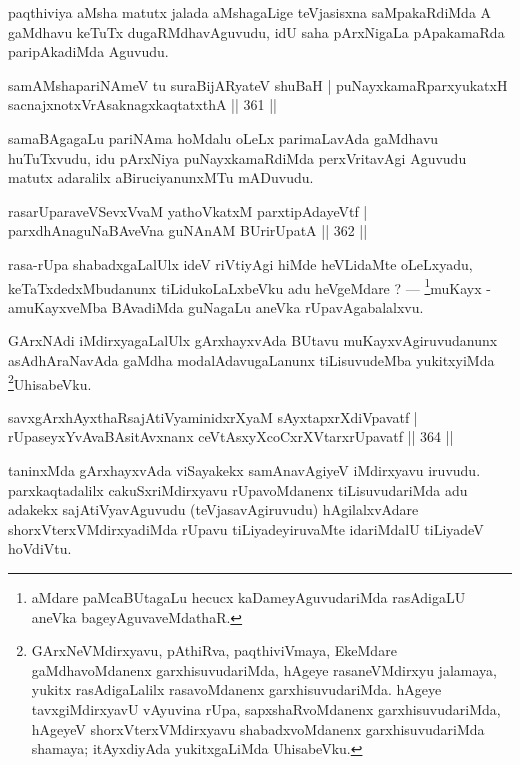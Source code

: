 \begin{artha}
paqthiviya aMsha matutx jalada aMshagaLige teVjasisxna saMpakaRdiMda A gaMdhavu keTuTx dugaRMdhavAguvudu, idU saha pArxNigaLa pApakamaRda paripAkadiMda Aguvudu.
\end{artha}

\begin{shl}
samAMshapariNAmeV tu suraBijARyateV shuBaH |
puNayxkamaRparxyukatxH sacnajxnotxVrAsaknagxkaqtatxthA \hfill || 361 ||
\end{shl}

\begin{artha}
samaBAgagaLu pariNAma hoMdalu oLeLx parimaLavAda gaMdhavu huTuTxvudu, idu pArxNiya puNayxkamaRdiMda perxVritavAgi Aguvudu matutx adaralilx aBiruciyanunxMTu mADuvudu.
\end{artha}

\begin{shl}
rasarUparaveVSevxVvaM yathoVkatxM parxtipAdayeVtf |
parxdhAnaguNaBAveVna guNAnAM BUrirUpatA \hfill  || 362 ||
\end{shl}

\begin{artha}
rasa-rUpa shabadxgaLalUlx ideV riVtiyAgi hiMde heVLidaMte oLeLxyadu, keTaTxdedxMbudanunx tiLidukoLaLxbeVku adu heVgeMdare ?  {\rm ---}  \footnote[1]{aMdare paMcaBUtagaLu hecucx kaDameyAguvudariMda rasAdigaLU aneVka bageyAguva\-veMdathaR.}muKayx - amuKayxveMba BAvadiMda guNagaLu aneVka rUpavAgabalalxvu.
\end{artha}

\begin{artha}
GArxNAdi iMdirxyagaLalUlx gArxhayxvAda BUtavu muKayxvAgiruvudanunx asAdhAraNavAda gaMdha modalAdavugaLanunx tiLisuvudeMba yukitxyiMda \footnote[2]{GArxNeVMdirxyavu, pAthiRva, paqthiviVmaya, EkeMdare gaMdhavoMdanenx garxhisuvudariMda, hAgeye rasaneVMdirxyu jalamaya, yukitx rasAdigaLalilx rasavoMdanenx garxhisuvudariMda. hAgeye tavxgiMdirxyavU vAyuvina rUpa, sapxshaRvoMdanenx garxhisuvudariMda, hAgeyeV shorxVterxVMdirxyavu shabadxvoMdanenx garxhisuvudariMda shamaya; itAyxdiyAda yukitxgaLiMda UhisabeVku.}UhisabeVku.
\end{artha}

\begin{shl}
savxgArxhAyxthaRsajAtiVyaminidxrXyaM sAyxtapxrXdiVpavatf |
rUpaseyxYvAvaBAsitAvxnanx ceVtAsxyXcoCxrXVtarxrUpavatf \hfill || 364 ||
\end{shl}

\begin{artha}
taninxMda gArxhayxvAda viSayakekx samAnavAgiyeV iMdirxyavu iruvudu. parxkaqta\-dalilx cakuSxriMdirxyavu rUpavoMdanenx tiLisuvudariMda adu adakekx sajAtiVya\-vAguvudu (teVjasavAgiruvudu) hAgilalxvAdare shorxVterxVMdirxyadiMda rUpavu tiLiyadeyiruvaMte idariMdalU tiLiyadeV hoVdiVtu.
\end{artha}

